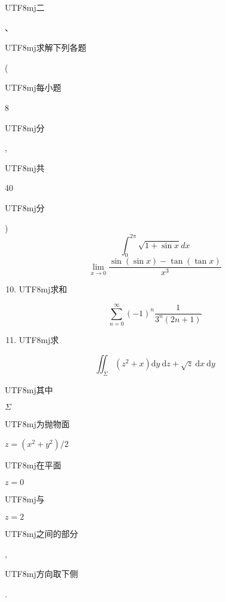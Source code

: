 \documentclass[10pt]{article}
\begin{document}
\begin{CJK}{UTF8}{mj}二\end{CJK}、\begin{CJK}{UTF8}{mj}求解下列各题\end{CJK} (\begin{CJK}{UTF8}{mj}每小题\end{CJK} 8 \begin{CJK}{UTF8}{mj}分\end{CJK}, \begin{CJK}{UTF8}{mj}共\end{CJK} 40 \begin{CJK}{UTF8}{mj}分\end{CJK})
$$
\int_{0}^{2 \pi} \sqrt{1+\sin x} d x
$$
$$
\lim _{x \rightarrow 0} \frac{\sin (\sin x)-\tan (\tan x)}{x^{3}}
$$

\begin{enumerate}
  \setcounter{enumi}{9}
  \item \begin{CJK}{UTF8}{mj}求和\end{CJK}
\end{enumerate}
$$
\sum_{n=0}^{\infty}(-1)^{n} \frac{1}{3^{n}(2 n+1)}
$$

\begin{enumerate}
  \setcounter{enumi}{10}
  \item \begin{CJK}{UTF8}{mj}求\end{CJK}
\end{enumerate}
$$
\iint_{\Sigma}\left(z^{2}+x\right) \mathrm{d} y \mathrm{~d} z+\sqrt{z} \mathrm{~d} x \mathrm{~d} y
$$
\begin{CJK}{UTF8}{mj}其中\end{CJK} $\Sigma$ \begin{CJK}{UTF8}{mj}为抛物面\end{CJK} $z=\left(x^{2}+y^{2}\right) / 2$ \begin{CJK}{UTF8}{mj}在平面\end{CJK} $z=0$ \begin{CJK}{UTF8}{mj}与\end{CJK} $z=2$ \begin{CJK}{UTF8}{mj}之间的部分\end{CJK}, \begin{CJK}{UTF8}{mj}方向取下侧\end{CJK}.
\end{document}
